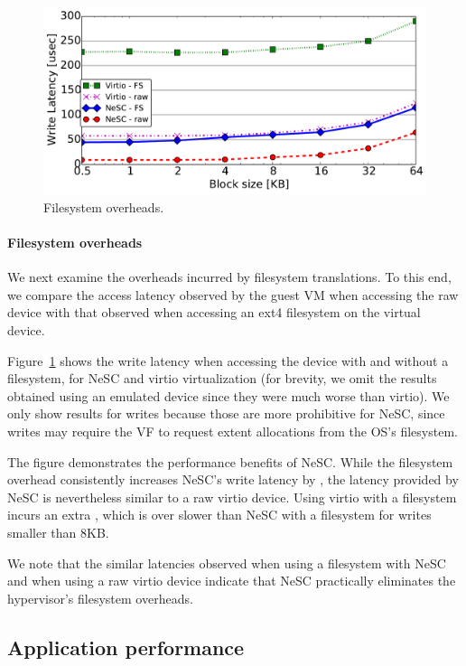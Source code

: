 \begin{figure}[t]
  \centering
  \includegraphics[width=1\columnwidth]{figs/fs_affect.pdf}
  \caption{Filesystem overheads.}
  \label{fig:fs_effect}
\end{figure}

\paragraph{Filesystem overheads}
We next examine the overheads incurred by filesystem translations. To this end, we compare the access latency observed by the guest VM when accessing the raw device with that observed when accessing an ext4 filesystem on the virtual device.

Figure~\ref{fig:fs_effect} shows the write latency when accessing the device with and without a filesystem, for NeSC and virtio virtualization (for brevity, we omit the results obtained using an emulated device since they were much worse than virtio). We only show results for writes because those are more prohibitive for NeSC, since writes may require the VF to request extent allocations from the OS's filesystem.

The figure demonstrates the performance benefits of NeSC. While the filesystem overhead consistently increases NeSC's write latency by \us, the latency provided by NeSC is nevertheless similar to a raw virtio device. Using virtio with a filesystem incurs an extra \us, which is over  slower than NeSC with a filesystem for writes smaller than 8KB.

We note that the similar latencies observed when using a filesystem with NeSC and when using a raw virtio device indicate that NeSC practically eliminates the hypervisor's filesystem overheads.

\subsection{Application performance}

